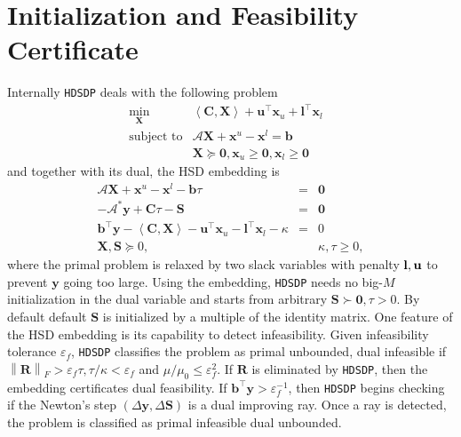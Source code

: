 \section{Initialization and Feasibility Certificate} \label{sec4}

Internally {{\texttt{HDSDP}}} deals with the following problem
\begin{eqnarray*}
  \min_{\mathbf{X}} & \left\langle \mathbf{C}, \mathbf{X} \right\rangle + \mathbf{u}^{\top} \mathbf{x}_u +
  \mathbf{l}^{\top} \mathbf{x}_l & \\
  \text{subject to} & \mathcal{A} \mathbf{X} + \mathbf{x}^u - \mathbf{x}^l = \mathbf{b} & \\
  & \mathbf{X} \succeq \textbf{0}, \mathbf{x}_u \geq \textbf{0}, \mathbf{x}_l \geq \textbf{0} & 
\end{eqnarray*}
and together with its dual, the HSD embedding is
\begin{eqnarray*}
  \mathcal{A} \mathbf{X} + \mathbf{x}^u - \mathbf{x}^l - \mathbf{b} \tau & = & \textbf{0}\\
  - \mathcal{A}^{\ast} \mathbf{y} + \mathbf{C} \tau - \mathbf{S} & = & \textbf{0}\\
  \mathbf{b}^{\top} \mathbf{y} - \left\langle \mathbf{C}, \mathbf{X} \right\rangle - \mathbf{u}^{\top} \mathbf{x}_u -
  \mathbf{l}^{\top} \mathbf{x}_l - \kappa & = & 0\\
  \mathbf{X}, \mathbf{S} \succeq 0, &  & \kappa, \tau \geq 0,
\end{eqnarray*}
where the primal problem is relaxed by two slack variables with penalty
$\textbf{{\textbf{l}}}, \mathbf{u}$ to prevent $\mathbf{y}$ going too large. Using the embedding, 
{{\texttt{HDSDP}}} needs no big-$M$ initialization
in the dual variable and starts from arbitrary $\mathbf{S} \succ \textbf{0}, \tau > 0$. By default
default $\mathbf{S}$ is initialized by a multiple of the identity matrix.
One feature of the HSD embedding is its capability to
detect infeasibility. Given infeasibility tolerance $\varepsilon_f$, {{\texttt{HDSDP}}}
classifies the problem as primal unbounded, dual infeasible if $\left\| \mathbf{R}
\right\|_F > \varepsilon_f \tau, \tau / \kappa < \varepsilon_f$ and $\mu /
\mu_0 \leq \varepsilon_f^2$. If $\mathbf{R}$ is eliminated by {{\texttt{HDSDP}}}, then
the embedding certificates dual feasibility. If $\mathbf{b}^{\top} \mathbf{y} >
\varepsilon_f^{- 1}$, then {{\texttt{HDSDP}}} begins checking if the Newton's
step $\left( \Delta \mathbf{y}, \Delta \mathbf{S} \right)$ is a dual improving ray. Once a ray is detected, the problem is classified as primal
infeasible dual unbounded.
